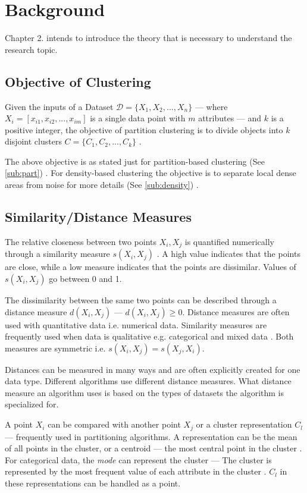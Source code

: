 \documentclass[../report.tex]{subfiles}
\begin{document}
\chapter{Background}
Chapter 2. intends to introduce the theory that is necessary to understand the research topic.

\section{Objective of Clustering}
Given the inputs of a Dataset $\mathcal{D} = \{X_{ 1 }, X_{ 2 },..., X_{ n } \}$ --- where $X_i = [x_{i1}, x_{i2},...,x_{im} ]$ is a single data point with $m$ attributes --- and $k$ is a positive integer, the objective of partition clustering is to divide objects into $k$ disjoint clusters ${C} = \{C_1, C_2,..., C_k \}$ \cite{Huang97clusteringlarge}.

The above objective is as stated just for partition-based clustering (See \ref{sub:part})
. For density-based clustering the objective is to separate local dense areas from noise for more details (See \ref{sub:density}) \cite{Ester1996}.

\section{Similarity/Distance Measures}
\label{ch:sim}
The relative closeness between two points $X_i, X_j$ is quantified numerically through a similarity measure $s(X_i, X_j)$ \cite{diday1976clustering}. A high value indicates that the points are close, while a low measure indicates that the points are dissimilar. Values of $s(X_i, X_j)$ go between 0 and 1.

The dissimilarity between the same two points can be described through a distance measure $d(X_i, X_j)$ --- $d(X_i, X_j) \geq 0$. Distance measures are often used with quantitative data i.e. numerical data. Similarity measures are frequently used when data is qualitative e.g. categorical and mixed data \cite{Wunsch2005}. Both measures are symmetric i.e. $s(X_i, X_j) = s(X_j, X_i)$.

Distances can be measured in many ways and are often explicitly created for one data type. Different algorithms use different distance measures. What distance measure an algorithm uses is based on the types of datasets the algorithm is specialized for.

A point $X_i$ can be compared with another point $X_j$ or a cluster representation $C_l$ --- frequently used in partitioning algorithms. A representation can be the mean of all points in the cluster, or a centroid --- the most central point in the cluster \cite{Guha2000, Kaufman1990}. For categorical data, the \textit{mode} can represent the cluster --- The cluster is represented by the most frequent value of each attribute in the cluster \cite{Ng1999}. $C_l$ in these representations can be handled as a point.
\end{document}
